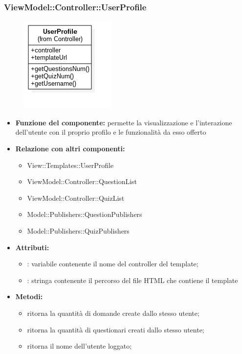   \subsubsection{ViewModel::Controller::UserProfile}
  \begin{figure}[h!]
\begin{center}
	\includegraphics[scale=0.6]{../images/ViewModel/Controller/UserProfile.png}
\end{center}
\end{figure}
 \begin{itemize}
 \item\textbf{Funzione del componente:} permette la visualizzazione e l'interazione dell'utente con il proprio profilo e le funzionalità da esso offerto\\
 \item\textbf{Relazione con altri componenti:}
 \begin{itemize}
 	\item View::Templates::UserProfile
 	\item ViewModel::Controller::QuestionList
 	\item ViewModel::Controller::QuizList
 	\item Model::Publishers::QuestionPublishers
 	\item Model::Publishers::QuizPublishers
 \end{itemize}
 \item\textbf{Attributi:}
 \begin{itemize}
 	\item{}: variabile contenente il nome del controller del template;\\
		\item{}: stringa contenente il percorso del file HTML che contiene il template\\
 \end{itemize}
 \item\textbf{Metodi:}
 	\begin{itemize}
 		\item{} ritorna la quantità di domande create dallo stesso utente;\\
		\item{} ritorna la quantità di questionari creati dallo stesso utente;\\
		\item{} ritorna il nome dell'utente loggato;\\
 	\end{itemize}
 \end{itemize}
\newpage
 
